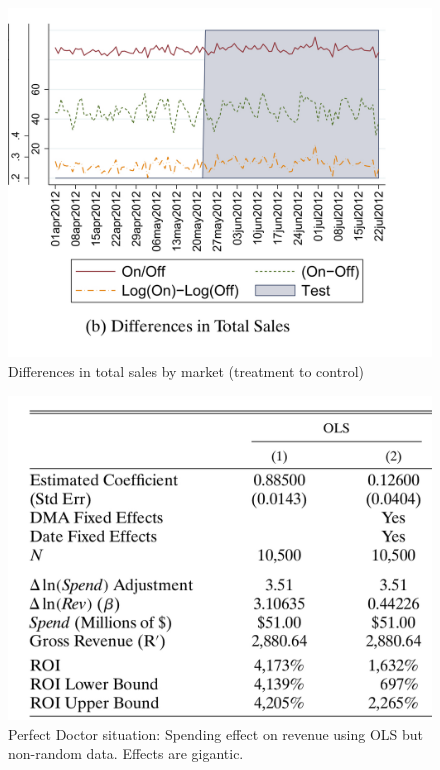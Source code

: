\documentclass{beamer}
\begin{document}
\begin{frame}

\begin{figure}
\begin{center}
\includegraphics[scale=0.2]{./lecture_includes/tadelis_fig2.png}
\caption{Differences in total sales by market (treatment to control)}
\end{center}
\end{figure}

\end{frame}

\begin{frame}

\begin{figure}
\begin{center}
\includegraphics[scale=0.2]{./lecture_includes/tadelis_ols1.png}
\caption{Perfect Doctor situation: Spending effect on revenue using OLS but non-random data. Effects are gigantic. }
\end{center}
\end{figure}

\end{frame}
\end{document}
